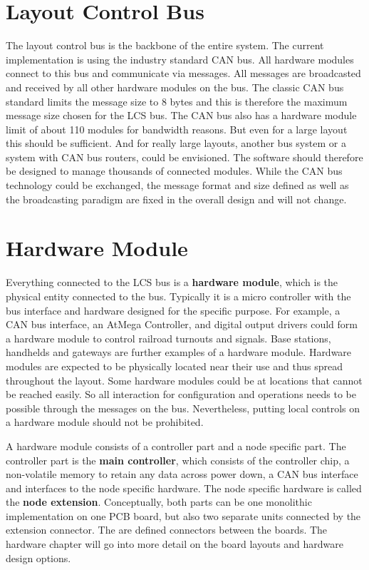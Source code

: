\section{Layout Control Bus}

The layout control bus is the backbone of the entire system. The current implementation is using the industry standard CAN bus. All hardware modules connect to this bus and communicate via messages. All messages are broadcasted and received by all other hardware modules on the bus. The classic CAN bus standard limits the message size to 8 bytes and this is therefore the maximum message size chosen for the LCS bus. The CAN bus also has a hardware module limit of about 110 modules for bandwidth reasons. But even for a large layout this should be sufficient. And for really large layouts, another bus system or a system with CAN bus routers, could be envisioned. The software should therefore be designed to manage thousands of connected modules. While the CAN bus technology could be exchanged, the message format and size defined as well as the broadcasting paradigm are fixed in the overall design and will not change.

\section{Hardware Module}

Everything connected to the LCS bus is a {\bf hardware module}, which is the physical entity connected to the bus. Typically it is a micro controller with the bus interface and hardware designed for the specific purpose. For example, a CAN bus interface, an AtMega Controller, and digital output drivers could form a hardware module to control railroad turnouts and signals. Base stations, handhelds and gateways are further examples of a hardware module. Hardware modules are expected to be physically located near their use and thus spread throughout the layout. Some hardware modules could be at locations that cannot be reached easily. So all interaction for configuration and operations needs to be possible through the messages on the bus. Nevertheless, putting local controls on a hardware module should not be prohibited.

A hardware module consists of a controller part and a node specific part. The controller part is the {\bf main controller}, which consists of the controller chip, a non-volatile memory to retain any data across power down, a CAN bus interface and interfaces to the node specific hardware. The node specific hardware is called the {\bf node extension}. Conceptually, both parts can be one monolithic implementation on one PCB board, but also two separate units connected by the extension connector. The are defined connectors between the boards. The hardware chapter will go into more detail on the board layouts and hardware design options.

